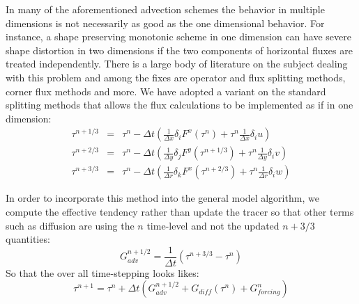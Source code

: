 In many of the aforementioned advection schemes the behavior in
multiple dimensions is not necessarily as good as the one dimensional
behavior. For instance, a shape preserving monotonic scheme in one
dimension can have severe shape distortion in two dimensions if the
two components of horizontal fluxes are treated independently. There
is a large body of literature on the subject dealing with this problem
and among the fixes are operator and flux splitting methods, corner
flux methods and more. We have adopted a variant on the standard
splitting methods that allows the flux calculations to be implemented
as if in one dimension:
\begin{eqnarray}
\tau^{n+1/3} & = & \tau^{n}
- \Delta t \left( \frac{1}{\Delta x} \delta_i F^x(\tau^{n})
           + \tau^{n} \frac{1}{\Delta x} \delta_i u \right) \\
\tau^{n+2/3} & = & \tau^{n}
- \Delta t \left( \frac{1}{\Delta y} \delta_j F^y(\tau^{n+1/3})
           + \tau^{n} \frac{1}{\Delta y} \delta_i v \right) \\
\tau^{n+3/3} & = & \tau^{n}
- \Delta t \left( \frac{1}{\Delta r} \delta_k F^x(\tau^{n+2/3})
           + \tau^{n} \frac{1}{\Delta r} \delta_i w \right)
\end{eqnarray}

In order to incorporate this method into the general model algorithm,
we compute the effective tendency rather than update the tracer so
that other terms such as diffusion are using the $n$ time-level and
not the updated $n+3/3$ quantities:
\begin{equation}
G^{n+1/2}_{adv} = \frac{1}{\Delta t} ( \tau^{n+3/3} - \tau^{n} )
\end{equation}
So that the over all time-stepping looks likes:
\begin{equation}
\tau^{n+1} = \tau^{n} + \Delta t \left( G^{n+1/2}_{adv} + G_{diff}(\tau^{n}) + G^{n}_{forcing} \right)
\end{equation}



